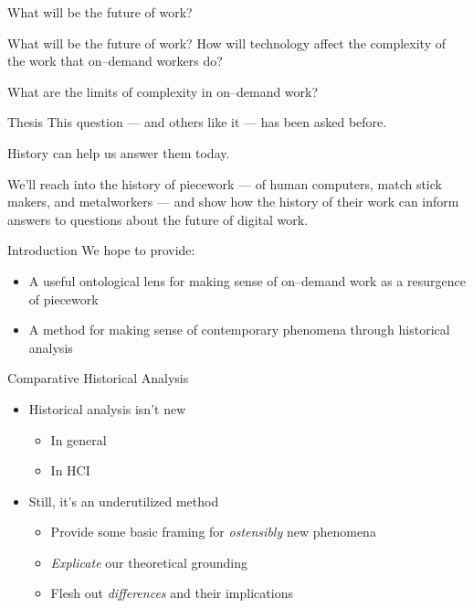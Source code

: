 \documentclass[presentation]{subfiles}
\begin{document}


\begin{frame}[standout]
    What will be the future of work?
\end{frame}

\begin{frame}{What will be the future of work?}
    How will \alert{technology} affect the complexity of the work that on--demand workers do?

    What are the \alert{limits} of complexity in on--demand work?
\end{frame}


\begin{frame}{Thesis}
    This question --- and others like it --- has been asked before.

    History can help us answer them today.

    We'll reach into the history of \alert{piecework}
    --- of human computers, match stick makers, and metalworkers ---
    and show how the \alert{history} of their work can
    inform answers to questions about the \alert{future} of digital work.
\end{frame}


\notinsubfile{
  
}


\begin{frame}{Introduction}
  We hope to provide:
      \begin{itemize}
        \item A useful ontological lens for making sense of on--demand work as a resurgence of \alert{piecework}
        \item A method for making sense of contemporary phenomena through \alert{historical analysis}
      \end{itemize}
\end{frame}


\begin{frame}{Comparative Historical Analysis}
\begin{itemize}
  \item Historical analysis isn't new
  \begin{itemize}
    \item In general\\
    \scriptsize{\textcite{rosenberg1994exploring,rosenberg1982inside}}\normalsize{}
    \item In HCI\\
    \scriptsize{\textcite{Wyche2006,bodker1993historical}}\normalsize{}
  \end{itemize}
  \item Still, it's an underutilized method
  \begin{itemize}
    \item Provide some basic framing for \emph{ostensibly} new phenomena
    \item \emph{Explicate} our theoretical grounding
    \item Flesh out \emph{differences} and their implications
  \end{itemize}
\end{itemize}
\end{frame}



\onlyinsubfile{
  \printbibliography{}
}
\end{document}
